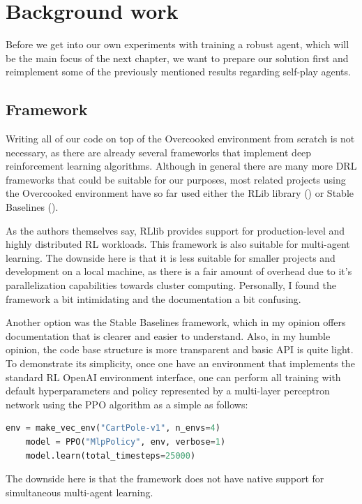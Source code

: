 \chapter{Background work}\label{BackgroundChapter}
Before we get into our own experiments with training a robust agent, which will be the main focus of the next chapter, we want to prepare our solution first and reimplement some of the previously mentioned results regarding self-play agents.

\section{Framework}
Writing all of our code on top of the Overcooked environment from scratch is not necessary, as there are already several frameworks that implement deep reinforcement learning algorithms.
Although in general there are many more DRL frameworks that could be suitable for our purposes, most related projects using the Overcooked environment have so far used either the RLib library (\cite{liang2018rllib}) or Stable Baselines (\cite{stable-baselines}).

As the authors themselves say, RLlib provides support for production-level and highly distributed RL workloads.
This framework is also suitable for multi-agent learning.
The downside here is that it is less suitable for smaller projects and development on a local machine, as there is a fair amount of overhead due to it's parallelization capabilities towards cluster computing.
Personally, I found the framework a bit intimidating and the documentation a bit confusing.

Another option was the Stable Baselines framework, which in my opinion offers documentation that is clearer and easier to understand.
Also, in my humble opinion, the code base structure is more transparent and basic API is quite light.
To demonstrate its simplicity, once one have an environment that implements the standard RL OpenAI environment interface, one can perform all training with default hyperparameters and policy represented by a multi-layer perceptron network using the PPO algorithm as a simple as follows:
\begin{lstlisting}[language=Python]
    env = make_vec_env("CartPole-v1", n_envs=4)
    model = PPO("MlpPolicy", env, verbose=1)
    model.learn(total_timesteps=25000)

\end{lstlisting}
The downside here is that the framework does not have native support for simultaneous multi-agent learning.

